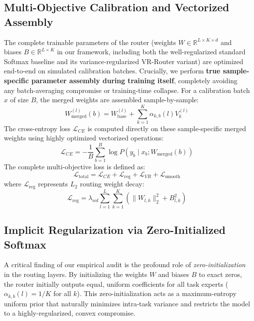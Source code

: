 \subsection{Multi-Objective Calibration and Vectorized Assembly}
The complete trainable parameters of the router (weights $W \in \mathbb{R}^{L \times K \times d}$ and biases $B \in \mathbb{R}^{L \times K}$ in our framework, including both the well-regularized standard Softmax baseline and its variance-regularized VR-Router variant) are optimized end-to-end on simulated calibration batches. Crucially, we perform \textbf{true sample-specific parameter assembly during training itself}, completely avoiding any batch-averaging compromise or training-time collapse. For a calibration batch $x$ of size $B$, the merged weights are assembled sample-by-sample:
\begin{equation}
    W_{\text{merged}}^{(l)}(b) = W_{\text{base}}^{(l)} + \sum_{k=1}^K \alpha_{k, b}(l) V_k^{(l)}
\end{equation}
The cross-entropy loss $\mathcal{L}_{CE}$ is computed directly on these sample-specific merged weights using highly optimized vectorized operations:
\begin{equation}
    \mathcal{L}_{CE} = -\frac{1}{B} \sum_{b=1}^B \log P(y_b \mid x_b; W_{\text{merged}}(b))
\end{equation}
The complete multi-objective loss is defined as:
\begin{equation}
    \mathcal{L}_{\text{total}} = \mathcal{L}_{CE} + \mathcal{L}_{\text{reg}} + \mathcal{L}_{VR} + \mathcal{L}_{\text{smooth}}
\end{equation}
where $\mathcal{L}_{\text{reg}}$ represents $L_2$ routing weight decay:
\begin{equation}
    \mathcal{L}_{\text{reg}} = \lambda_{wd} \sum_{l=1}^L \sum_{k=1}^K \left( \|W_{l, k}\|_2^2 + B_{l, k}^2 \right)
\end{equation}

\subsection{Implicit Regularization via Zero-Initialized Softmax}
A critical finding of our empirical audit is the profound role of \emph{zero-initialization} in the routing layers. By initializing the weights $W$ and biases $B$ to exact zeros, the router initially outputs equal, uniform coefficients for all task experts ($\alpha_{k, b}(l) = 1/K$ for all $k$). This zero-initialization acts as a maximum-entropy uniform prior that naturally minimizes intra-task variance and restricts the model to a highly-regularized, convex compromise.

